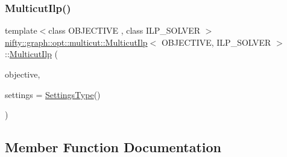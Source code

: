 \mbox{\label{classnifty_1_1graph_1_1opt_1_1multicut_1_1MulticutIlp_ac93adc7fbfdafdee8c2ff27cf2b31656}} 
\subsubsection{\texorpdfstring{Multicut\+Ilp()}{MulticutIlp()}}
{\footnotesize\ttfamily template$<$class O\+B\+J\+E\+C\+T\+I\+VE , class I\+L\+P\+\_\+\+S\+O\+L\+V\+ER $>$ \\
\hyperlink{classnifty_1_1graph_1_1opt_1_1multicut_1_1MulticutIlp}{nifty\+::graph\+::opt\+::multicut\+::\+Multicut\+Ilp}$<$ O\+B\+J\+E\+C\+T\+I\+VE, I\+L\+P\+\_\+\+S\+O\+L\+V\+ER $>$\+::\hyperlink{classnifty_1_1graph_1_1opt_1_1multicut_1_1MulticutIlp}{Multicut\+Ilp} (\begin{DoxyParamCaption}\item[{const \hyperlink{classnifty_1_1graph_1_1opt_1_1multicut_1_1MulticutIlp_acd5485d2d20d1e89c5202fc677993d5a}{Objective\+Type} \&}]{objective,  }\item[{const \hyperlink{structnifty_1_1graph_1_1opt_1_1multicut_1_1MulticutIlp_1_1SettingsType}{Settings\+Type} \&}]{settings = {\ttfamily \hyperlink{structnifty_1_1graph_1_1opt_1_1multicut_1_1MulticutIlp_1_1SettingsType}{Settings\+Type}()} }\end{DoxyParamCaption})}



\subsection{Member Function Documentation}
\mbox{\label{classnifty_1_1graph_1_1opt_1_1multicut_1_1MulticutIlp_a6851390d398b64c24315e60803aee297}} 
